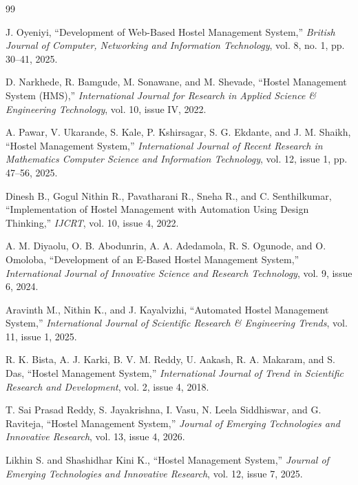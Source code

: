 \documentclass[conference]{IEEEtran}
\begin{document}
\begin{thebibliography}{99}

J. Oyeniyi, ``Development of Web-Based Hostel Management System,'' \emph{British Journal of Computer, Networking and Information Technology}, vol. 8, no. 1, pp. 30--41, 2025.

D. Narkhede, R. Bamgude, M. Sonawane, and M. Shevade, ``Hostel Management System (HMS),'' \emph{International Journal for Research in Applied Science \& Engineering Technology}, vol. 10, issue IV, 2022.

A. Pawar, V. Ukarande, S. Kale, P. Kshirsagar, S. G. Ekdante, and J. M. Shaikh, ``Hostel Management System,'' \emph{International Journal of Recent Research in Mathematics Computer Science and Information Technology}, vol. 12, issue 1, pp. 47--56, 2025.

Dinesh B., Gogul Nithin R., Pavatharani R., Sneha R., and C. Senthilkumar, ``Implementation of Hostel Management with Automation Using Design Thinking,'' \emph{IJCRT}, vol. 10, issue 4, 2022.

A. M. Diyaolu, O. B. Abodunrin, A. A. Adedamola, R. S. Ogunode, and O. Omoloba, ``Development of an E-Based Hostel Management System,'' \emph{International Journal of Innovative Science and Research Technology}, vol. 9, issue 6, 2024.

Aravinth M., Nithin K., and J. Kayalvizhi, ``Automated Hostel Management System,'' \emph{International Journal of Scientific Research \& Engineering Trends}, vol. 11, issue 1, 2025.

R. K. Bista, A. J. Karki, B. V. M. Reddy, U. Aakash, R. A. Makaram, and S. Das, ``Hostel Management System,'' \emph{International Journal of Trend in Scientific Research and Development}, vol. 2, issue 4, 2018.

T. Sai Prasad Reddy, S. Jayakrishna, I. Vasu, N. Leela Siddhiswar, and G. Raviteja, ``Hostel Management System,'' \emph{Journal of Emerging Technologies and Innovative Research}, vol. 13, issue 4, 2026.

Likhin S. and Shashidhar Kini K., ``Hostel Management System,'' \emph{Journal of Emerging Technologies and Innovative Research}, vol. 12, issue 7, 2025.

\end{thebibliography}
\end{document}
